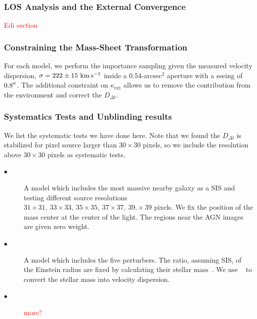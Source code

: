 \documentclass[useAMS,usenatbib]{mnras}
\newcommand\todo[1]{\textcolor{red}{#1}}
\def\kms {\rm km\,s^{-1}}
\newcommand{\Ddt}{D_{\Delta t}}
\begin{document}
\subsubsection{LOS Analysis and the External Convergence}
\todo{Edi section}

\subsubsection{Constraining the Mass-Sheet Transformation}
For each model, we perform the importance sampling given the measured velocity dispersion, $\sigma=222\pm15~\kms$ \citep{WongEtal17} inside a 0.54-arcsec$^{2}$ aperture with a seeing of $0.8\hbox{$^{\prime\prime}$}$. The additional constraint on $\kappa_{\textrm{ext}}$ allows us to remove the contribution from the environment and correct the $\Ddt$.
\subsubsection{Systematics Tests and Unblinding results}
We list the systematic tests we have done here. Note that we found the $\Ddt$ is stabilized for pixel source larger than $30\times 30$ pixels, so we include the resolution above $30\times 30$ pixels as systematic tests.
\begin{description}
  \item[$\bullet$] A model which includes the most massive nearby galaxy as a SIS and testing different source resolutions $31\times31,~33\times33,~35\times35,~37\times37,~39. \times39$ pixels. We fix the position of the mass center at the center of the light. The regions near the AGN images are given zero weight.
  \item[$\bullet$] A model which includes the five perturbers. The ratio, assuming SIS, of the Einstein radius are fixed by calculating their stellar mass~\citep{RusuEtal17}. We use ~\citet{BernnardiEtal11} to convert the stellar mass into velocity dispersion.
  \item[$\bullet$] \todo{more?}
\end{description}
\end{document}
